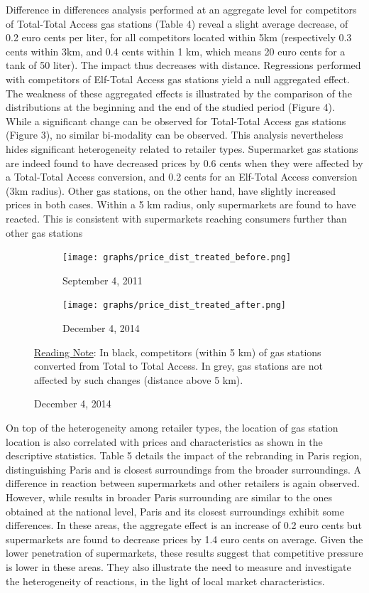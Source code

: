 \documentclass[english]{article}
\begin{document}
Difference in differences analysis performed at an aggregate level for competitors of Total-Total Access gas stations (Table 4) reveal a slight average decrease, of 0.2 euro cents per liter, for all competitors located within 5km (respectively 0.3 cents within 3km, and 0.4 cents within 1 km, which means 20 euro cents for a tank of 50 liter). The impact thus decreases with distance. Regressions performed with competitors of Elf-Total Access gas stations yield a null aggregated effect. The weakness of these aggregated effects is illustrated by the comparison of the distributions at the beginning and the end of the studied period (Figure 4). While a significant change can be observed for Total-Total Access gas stations (Figure 3), no similar bi-modality can be observed. This analysis nevertheless hides significant heterogeneity related to retailer types. Supermarket gas stations are indeed found to have decreased prices by 0.6 cents when they were affected by a Total-Total Access conversion, and 0.2 cents for an Elf-Total Access conversion (3km radius). Other gas stations, on the other hand, have slightly increased prices in both cases. Within a 5 km radius, only supermarkets are found to have reacted. This is consistent with supermarkets reaching consumers further than other gas stations \medskip{}

\begin{figure}[H]
\centering
\caption{Distributions of Total Access competitor prices vs .others}
\label{fig:price_dist_total_comp_ba}
\begin{subfigure}[t]{.49\columnwidth}
\centering
\texttt{[image: graphs/price\_dist\_treated\_before.png]}
\caption[short]{September 4, 2011}
\end{subfigure}
\begin{subfigure}[t]{.49\columnwidth}
\centering
\texttt{[image: graphs/price\_dist\_treated\_after.png]}
\caption[short]{December 4, 2014}
\end{subfigure}
\flushleft
{\small{}\uline{Reading Note}}{\small{}: In black, competitors (within 5 km) of gas stations converted from Total to Total Access. In grey, gas stations are not affected by such changes (distance above 5 km).}{\small \par}
\end{figure}

On top of the heterogeneity among retailer types, the location of gas station location is also correlated with prices and characteristics as shown in the descriptive statistics. Table 5 details the impact of the rebranding in Paris region, distinguishing Paris and is closest surroundings from the broader surroundings. A difference in reaction between supermarkets and other retailers is again observed. However, while results in broader Paris surrounding are similar to the ones obtained at the national level, Paris and its closest surroundings exhibit some differences. In these areas, the aggregate effect is an increase of 0.2 euro cents but supermarkets are found to decrease prices by 1.4 euro cents on average. Given the lower penetration of supermarkets, these results suggest that competitive pressure is lower in these areas. They also illustrate the need to measure and investigate the heterogeneity of reactions, in the light of local market characteristics.\medskip{}
\end{document}
